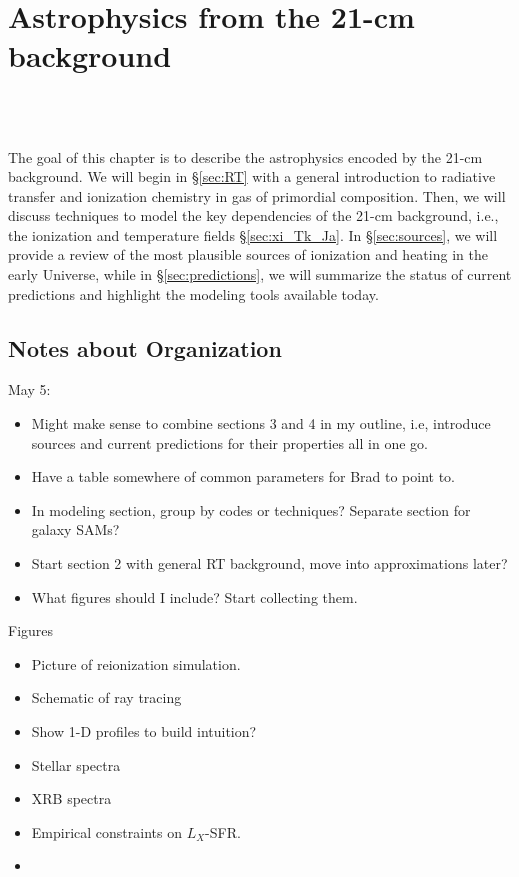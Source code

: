 

\chapter{Astrophysics from the 21-cm background}

\begin{bf}
  \author{Jordan Mirocha}\\
\\
\end{bf}

The goal of this chapter is to describe the astrophysics encoded by the 21-cm background. We will begin in \S\ref{sec:RT} with a general introduction to radiative transfer and ionization chemistry in gas of primordial composition. Then, we will discuss techniques to model the key dependencies of the 21-cm background, i.e., the ionization and temperature fields \S\ref{sec:xi_Tk_Ja}. In \S\ref{sec:sources}, we will provide a review of the most plausible sources of ionization and heating in the early Universe, while in \S\ref{sec:predictions}, we will summarize the status of current predictions and highlight the modeling tools available today.


\section{Notes about Organization}

May 5:
\begin{itemize}
	\item Might make sense to combine sections 3 and 4 in my outline, i.e, introduce sources and current predictions for their properties all in one go.
	\item Have a table somewhere of common parameters for Brad to point to.
	\item In modeling section, group by codes or techniques? Separate section for galaxy SAMs?
	\item Start section 2 with general RT background, move into approximations later?
	\item What figures should I include? Start collecting them.
\end{itemize}

Figures 
\begin{itemize}
	\item Picture of reionization simulation.
	\item Schematic of ray tracing
	\item Show 1-D profiles to build intuition?
	\item Stellar spectra
	\item XRB spectra 
	\item Empirical constraints on $L_X$-SFR.
	\item 
\end{itemize}


